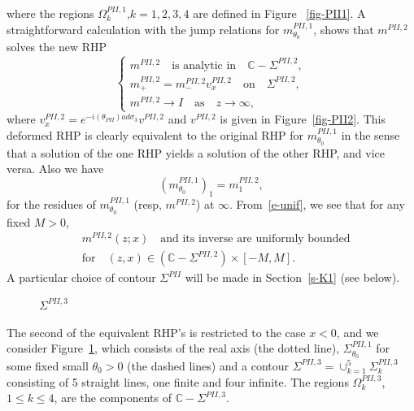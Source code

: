 \documentclass{amsart}
\theoremstyle{definition}
\theoremstyle{remark}
\numberwithin{equation}{section}
\newcommand{\C}{\mathbb C}
\begin{document}
where the regions $\Omega^{PII,1}_{k}$,$k=1,2,3,4$ are defined  
in Figure ~\ref{fig-PII1}.
A straightforward calculation with the jump relations for 
$m_{\theta_0}^{PII,1}$, 
shows that 
$m^{PII,2}$ solves the new RHP
\begin{equation}\label{e-RHPm2}
  \begin{cases}
    m^{PII,2}\quad\text{is analytic in}\quad\C-\Sigma^{PII,2},\\
    m^{PII,2}_+=m^{PII,2}_-v^{PII,2}_x\quad\text{on}
\quad\Sigma^{PII,2},\\
    m^{PII,2}\to I\quad\text{as}\quad z\to\infty,
  \end{cases}
\end{equation}
where $v^{PII,2}_{x}=e^{-i(\theta_{PII})ad\sigma_3}v^{PII,2}$ 
and $v^{PII,2}$ is given in Figure~\ref{fig-PII2}.
This deformed RHP is clearly equivalent to the original RHP 
for $m_{\theta_0}^{PII,1}$
in the sense that a solution of the one RHP yields a solution 
of the other RHP, and vice versa.
Also we have 
\begin{equation}\label{e-RHPm2'}
   (m_{\theta_0}^{PII,1})_1=m_1^{PII,2},
\end{equation}
for the residues of $m_{\theta_0}^{PII,1}$ (resp, $m^{PII,2}$) at $\infty$.
From~\eqref{e-unif}, 
we see that for any fixed $M>0$, 
\begin{equation}\label{e-unif2}
 \begin{split}
   &m^{PII,2}(z;x) \quad\text{and its inverse are uniformly bounded}\\
   &\text{for}\quad  (z,x)\in(\C-\Sigma^{PII,2})\times[-M,M].
 \end{split}
\end{equation}
A particular choice of contour $\Sigma^{PII}$ will be made in 
Section~\ref{s-K1} (see below).

\bigskip
\begin{figure}[ht]
 \centerline{}
 \caption{$\Sigma^{PII,3}$}\label{fig-PII3}
\end{figure}
The second of the equivalent RHP's is restricted to the case $x<0$, 
and we consider 
Figure~\ref{fig-PII3}, which consists of the real axis (the dotted line), 
$\Sigma^{PII,1}_{\theta_0}$ for some fixed small $\theta_0>0$ 
(the dashed lines) and a contour $\Sigma^{PII,3}=
\cup_{k=1}^{5}\Sigma^{PII,3}_{k}$ consisting of 5 straight lines, one 
finite and four infinite.
The regions $\Omega^{PII,3}_k$, $1\le k\le 4$, are the components 
of $\C-\Sigma^{PII,3}$.
\end{document}
